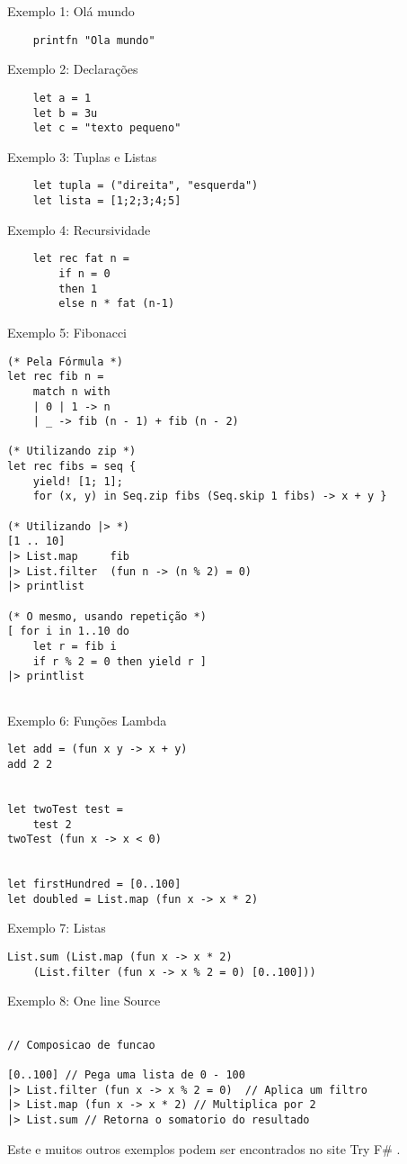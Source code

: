 \documentclass[12pt]{article}
\begin{document}
Exemplo 1: Olá mundo
\begin{lstlisting}
    printfn "Ola mundo"
\end{lstlisting}
Exemplo 2: Declarações
\begin{lstlisting}
    let a = 1
    let b = 3u
    let c = "texto pequeno"
\end{lstlisting}    
Exemplo 3: Tuplas e Listas
\begin{lstlisting}
    let tupla = ("direita", "esquerda")
    let lista = [1;2;3;4;5]
 \end{lstlisting}     
Exemplo 4: Recursividade
\begin{lstlisting}
    let rec fat n =
        if n = 0
        then 1
        else n * fat (n-1)
 \end{lstlisting}  
Exemplo 5: Fibonacci
 \begin{lstlisting}
(* Pela Fórmula *)
let rec fib n =
    match n with
    | 0 | 1 -> n
    | _ -> fib (n - 1) + fib (n - 2)
 
(* Utilizando zip *)
let rec fibs = seq {
    yield! [1; 1];
    for (x, y) in Seq.zip fibs (Seq.skip 1 fibs) -> x + y }
 
(* Utilizando |> *)
[1 .. 10]
|> List.map     fib
|> List.filter  (fun n -> (n % 2) = 0)
|> printlist
 
(* O mesmo, usando repetição *)
[ for i in 1..10 do
    let r = fib i
    if r % 2 = 0 then yield r ]
|> printlist 
 
 \end{lstlisting}
Exemplo 6: Funções Lambda
\begin{lstlisting}
let add = (fun x y -> x + y)
add 2 2


let twoTest test =
    test 2
twoTest (fun x -> x < 0)


let firstHundred = [0..100]
let doubled = List.map (fun x -> x * 2)

\end{lstlisting}
Exemplo 7: Listas

\begin{lstlisting}
List.sum (List.map (fun x -> x * 2) 
    (List.filter (fun x -> x % 2 = 0) [0..100]))
\end{lstlisting}
Exemplo 8: One line Source

\begin{lstlisting}

// Composicao de funcao

[0..100] // Pega uma lista de 0 - 100
|> List.filter (fun x -> x % 2 = 0)  // Aplica um filtro
|> List.map (fun x -> x * 2) // Multiplica por 2
|> List.sum // Retorna o somatorio do resultado
\end{lstlisting}

Este e muitos outros exemplos podem ser encontrados no site Try F# \cite{tryfs}.






\end{document}
